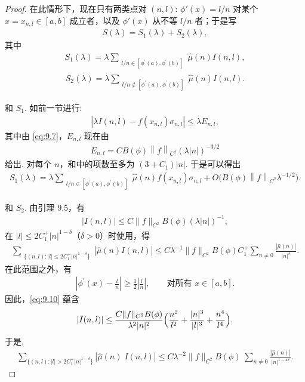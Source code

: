 \begin{proof}
在此情形下，现在只有两类点对 $(n,l)$: $\phi'(x) = l/n$ 对某个 $x = x_{n,l} \in [a,b]$ 成立者，以及 $\phi'(x)$ 从不等 $l/n$ 者；于是写
\begin{align*}
  S(\lambda)=S_{1}(\lambda)+S_{2}(\lambda),
\end{align*}
其中
\begin{align*}
  S_{1}(\lambda)=\lambda\sum_{\substack{l/n\in[\phi^{\prime}(a),\phi^{\prime}(b)]}}\hat{\mu}(n)I(n,l),
\end{align*}
\begin{align*}
  S_{2}(\lambda)=\lambda\sum_{\substack{l/n\notin[\phi^{\prime}(a),\phi^{\prime}(b)]}}\hat{\mu}(n)I(n,l).
\end{align*}

和 $S_{1}$. 如前一节进行:
\begin{align*}
  |\lambda I(n,l)-f(x_{n,l})\sigma_{n,l}|\leq\lambda E_{n,l},
\end{align*}
其中由 \eqref{eq:9.7}，$E_{n,l}$ 现在由
\begin{align*}
  E_{n,l}=C B(\phi)\left\|f\right\|_{C^{2}}(\lambda|n|)^{-3/2}
\end{align*}
给出. 对每个 $n$，和中的项数至多为 $(3 + C_1)|n|$. 于是可以得出
\begin{align*}
  S_{1}(\lambda)=\lambda\sum_{\substack{l/n\in[\phi^{\prime}(a),\phi^{\prime}(b)]}}\hat{\mu}(n)f(x_{n,l})\sigma_{n,l}
  +O\bigl(B(\phi)\left\|f\right\|_{C^{2}}\lambda^{-1/2}\bigr).
\end{align*}

和 $S_{2}$. 由引理 9.5，有
\begin{align*}
  |I(n,l)|\leq C\|f\|_{C^{2}}B(\phi)(\lambda|n|)^{-1},
\end{align*}
在 $|l| \leq 2C_1^+|n|^{1-\delta}$（$\delta > 0$）时使用，得
\begin{align*}
  \sum_{\substack{\{(n,l):|l|\leq 2C_{1}^{+}|n|^{1-\delta}\}}}|\hat{\mu}(n)I(n,l)|
  \leq C\lambda^{-1}\|f\|_{C^{2}}B(\phi)C_{1}^{+}\sum_{n\neq 0}\frac{|\hat{\mu}(n)|}{|n|^{\delta}}.
\end{align*}
在此范围之外，有
\begin{align*}
  \left|\phi^{\prime}(x)-\frac{l}{n}\right|\geq\frac{1}{2}\left|\frac{l}{n}\right|,\qquad \text{对所有 } x\in[a,b].
\end{align*}
因此，\eqref{eq:9.10} 蕴含
\begin{align*}
  |I(n,l)|\leq\frac{C\|f\|_{C^{2}}B(\phi)}{\lambda^{2}|n|^{2}}
  \Bigl(\frac{n^{2}}{l^{2}}+\frac{|n|^{3}}{|l|^{3}}+\frac{n^{4}}{l^{4}}\Bigr).
\end{align*}
于是,
\begin{align*}
  \sum_{\{(n,l):|l|>2C_{1}^{+}|n|^{1-\delta}\}}|\hat{\mu}(n)\;I(n,l)|
  \leq C\lambda^{-2}\|f\|_{C^{2}}B(\phi)\;\sum_{n\neq 0}\frac{|\hat{\mu}(n)|}{|n|^{1-4\delta}}.
\end{align*}
\end{proof}

